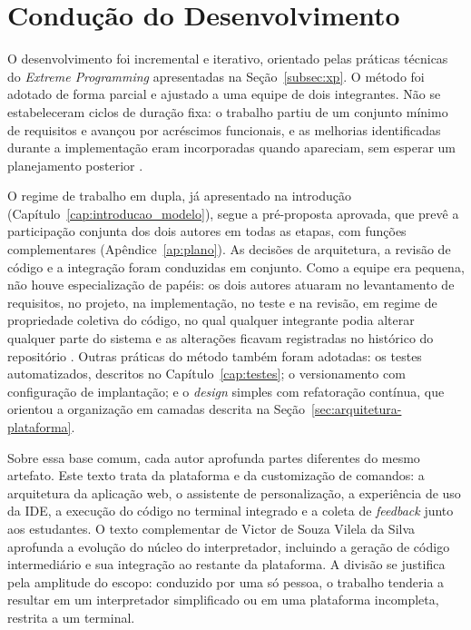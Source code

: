 \section{Condução do Desenvolvimento}
\label{sec:conducao-desenvolvimento}

O desenvolvimento foi incremental e iterativo, orientado pelas práticas técnicas do \textit{Extreme Programming} apresentadas na Seção~\ref{subsec:xp}. O método foi adotado de forma parcial e ajustado a uma equipe de dois integrantes. Não se estabeleceram ciclos de duração fixa: o trabalho partiu de um conjunto mínimo de requisitos e avançou por acréscimos funcionais, e as melhorias identificadas durante a implementação eram incorporadas quando apareciam, sem esperar um planejamento posterior \cite{beck2004,wildt2015}.

O regime de trabalho em dupla, já apresentado na introdução (Capítulo~\ref{cap:introducao_modelo}), segue a pré-proposta aprovada, que prevê a participação conjunta dos dois autores em todas as etapas, com funções complementares (Apêndice~\ref{ap:plano}). As decisões de arquitetura, a revisão de código e a integração foram conduzidas em conjunto. Como a equipe era pequena, não houve especialização de papéis: os dois autores atuaram no levantamento de requisitos, no projeto, na implementação, no teste e na revisão, em regime de propriedade coletiva do código, no qual qualquer integrante podia alterar qualquer parte do sistema e as alterações ficavam registradas no histórico do repositório \cite{wildt2015}. Outras práticas do método também foram adotadas: os testes automatizados, descritos no Capítulo~\ref{cap:testes}; o versionamento com configuração de implantação; e o \textit{design} simples com refatoração contínua, que orientou a organização em camadas descrita na Seção~\ref{sec:arquitetura-plataforma}.

Sobre essa base comum, cada autor aprofunda partes diferentes do mesmo artefato. Este texto trata da plataforma e da customização de comandos: a arquitetura da aplicação web, o assistente de personalização, a experiência de uso da IDE, a execução do código no terminal integrado e a coleta de \textit{feedback} junto aos estudantes. O texto complementar de Victor de Souza Vilela da Silva aprofunda a evolução do núcleo do interpretador, incluindo a geração de código intermediário e sua integração ao restante da plataforma. A divisão se justifica pela amplitude do escopo: conduzido por uma só pessoa, o trabalho tenderia a resultar em um interpretador simplificado ou em uma plataforma incompleta, restrita a um terminal.

